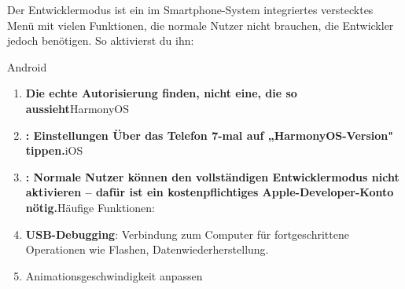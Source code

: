 \begin{tcbwarn}{Der Entwicklermodus ist ein im Smartphone-System integriertes verstecktes Menü mit vielen Funktionen, die normale Nutzer nicht brauchen, die Entwickler jedoch benötigen.}
So aktivierst du ihn:

\end{tcbwarn}

\begin{tcbpractice}{Android}
\begin{enumerate}
  \item \textbf{Die echte Autorisierung finden, nicht eine, die so aussieht}HarmonyOS
  \item \textbf{: Einstellungen Über das Telefon 7-mal auf „HarmonyOS-Version" tippen.}iOS
  \item \textbf{: Normale Nutzer können den vollständigen Entwicklermodus nicht aktivieren – dafür ist ein kostenpflichtiges Apple-Developer-Konto nötig.}Häufige Funktionen:
  \item \textbf{USB-Debugging}: Verbindung zum Computer für fortgeschrittene Operationen wie Flashen, Datenwiederherstellung.
  \item Animationsgeschwindigkeit anpassen
\end{enumerate}

\end{tcbpractice}
